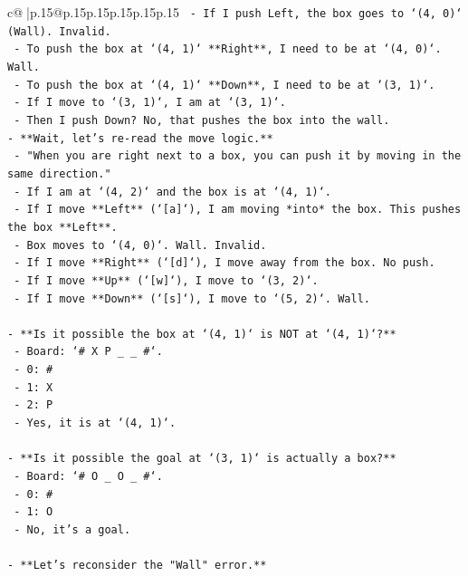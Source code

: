 \documentclass{article}
\begin{document}
{\begin{supertabular}{c@{$\;$}|p{.15\linewidth}@{}p{.15\linewidth}p{.15\linewidth}p{.15\linewidth}p{.15\linewidth}p{.15\linewidth}}
{{{\texttt{        {-} If I push Left, the box goes to `(4, 0)` (Wall). Invalid.} \\
\texttt{    {-} To push the box at `(4, 1)` **Right**, I need to be at `(4, 0)`. Wall.} \\
\texttt{    {-} To push the box at `(4, 1)` **Down**, I need to be at `(3, 1)`.} \\
\texttt{        {-} If I move to `(3, 1)`, I am at `(3, 1)`.} \\
\texttt{        {-} Then I push Down? No, that pushes the box into the wall.} \\
\texttt{{-} **Wait, let's re{-}read the move logic.**} \\
\texttt{    {-} "When you are right next to a box, you can push it by moving in the same direction."} \\
\texttt{    {-} If I am at `(4, 2)` and the box is at `(4, 1)`.} \\
\texttt{    {-} If I move **Left** (`{[}a{]}`), I am moving *into* the box. This pushes the box **Left**.} \\
\texttt{    {-} Box moves to `(4, 0)`. Wall. Invalid.} \\
\texttt{    {-} If I move **Right** (`{[}d{]}`), I move away from the box. No push.} \\
\texttt{    {-} If I move **Up** (`{[}w{]}`), I move to `(3, 2)`.} \\
\texttt{    {-} If I move **Down** (`{[}s{]}`), I move to `(5, 2)`. Wall.} \\
\\ 
\texttt{{-} **Is it possible the box at `(4, 1)` is NOT at `(4, 1)`?**} \\
\texttt{    {-} Board: `\# X P \_ \_ \#`.} \\
\texttt{    {-} 0: \#} \\
\texttt{    {-} 1: X} \\
\texttt{    {-} 2: P} \\
\texttt{    {-} Yes, it is at `(4, 1)`.} \\
\\ 
\texttt{{-} **Is it possible the goal at `(3, 1)` is actually a box?**} \\
\texttt{    {-} Board: `\# O \_ O \_ \#`.} \\
\texttt{    {-} 0: \#} \\
\texttt{    {-} 1: O} \\
\texttt{    {-} No, it's a goal.} \\
\\ 
\texttt{{-} **Let's reconsider the "Wall" error.**} \\
}}}
\end{supertabular}}
\end{document}
